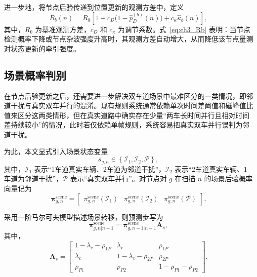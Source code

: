 \documentclass{xdupgthesis}
\begin{document}
进一步地，将节点后验传递到位置更新的观测方差中，定义
\begin{equation}
	R_b(n)=
	R_0\left[
	1+c_D\bigl(1-\hat p_D^{(b)}(n)\bigr)+c_{\kappa}\hat\kappa_b(n)
	\right],
	\label{eq:ch3_Rb}
\end{equation}
其中，$R_0$ 为基准观测方差，$c_D$ 和 $c_{\kappa}$ 为调节系数。式~\eqref{eq:ch3_Rb} 表明：当节点检测概率下降或节点杂波强度升高时，其观测方差自动增大，从而降低该节点量测对状态更新的牵引强度。

\subsection{场景概率判别}

在节点后验更新之后，还需要进一步解决双车道场景中最难区分的一类情况，即邻道干扰与真实双车并行的混淆。现有规则系统通常依赖单次时间差阈值和磁峰值比值来区分这两类情形，但在真实道路中确实存在少量“两车长时间并行且相对时间差持续较小”的情况，此时若仅依赖单帧规则，系统容易把真实双车并行误判为邻道干扰。

为此，本文显式引入场景状态变量
\begin{equation}
	s_{g,n}\in\left\{\mathcal I_1,\mathcal I_2,\mathcal P\right\},
	\label{eq:ch3_scene_state}
\end{equation}
其中，$\mathcal I_1$ 表示“1车道真实车辆、2车道为邻道干扰”，$\mathcal I_2$ 表示“2车道真实车辆、1车道为邻道干扰”，$\mathcal P$ 表示“真实双车并行”。对节点对 $g$ 在扫描 $n$ 的场景后验概率向量记为
\begin{equation}
	\boldsymbol\pi_{g,n}^{\mathrm{scene}}=
	\begin{bmatrix}
		\pi_{g,n}^{\mathrm{scene}}(\mathcal I_1) &
		\pi_{g,n}^{\mathrm{scene}}(\mathcal I_2) &
		\pi_{g,n}^{\mathrm{scene}}(\mathcal P)
	\end{bmatrix}.
	\label{eq:ch3_scene_vector}
\end{equation}

采用一阶马尔可夫模型描述场景转移，则预测步写为
\begin{equation}
	\boldsymbol\pi_{g,n|n-1}^{\mathrm{scene}}=
	\boldsymbol\pi_{g,n-1|n-1}^{\mathrm{scene}}
	\mathbf A_s,
	\label{eq:ch3_scene_predict}
\end{equation}
其中，
\begin{equation}
	\mathbf A_s=
	\begin{bmatrix}
		1-\lambda_c-\rho_{1P} & \lambda_c & \rho_{1P}\\
		\lambda_c & 1-\lambda_c-\rho_{2P} & \rho_{2P}\\
		\rho_{P1} & \rho_{P2} & 1-\rho_{P1}-\rho_{P2}
	\end{bmatrix}.
	\label{eq:ch3_As}
\end{equation}
\end{document}
